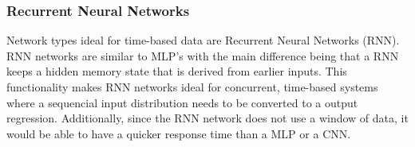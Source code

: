 \documentclass[../main.tex]{subfiles}
\begin{document}
%
%
%
%
%
%
\subsubsection{Recurrent Neural Networks}

Network types ideal for time-based data are Recurrent Neural Networks (RNN).
RNN networks are similar to MLP's with the main difference being that a RNN keeps a hidden memory state that is derived from earlier inputs.
This functionality makes RNN networks ideal for concurrent, time-based systems where a sequencial input distribution needs to be converted to a output regression.  
Additionally, since the RNN network does not use a window of data, it would be able to have a quicker response time than a MLP or a CNN.
\end{document}
